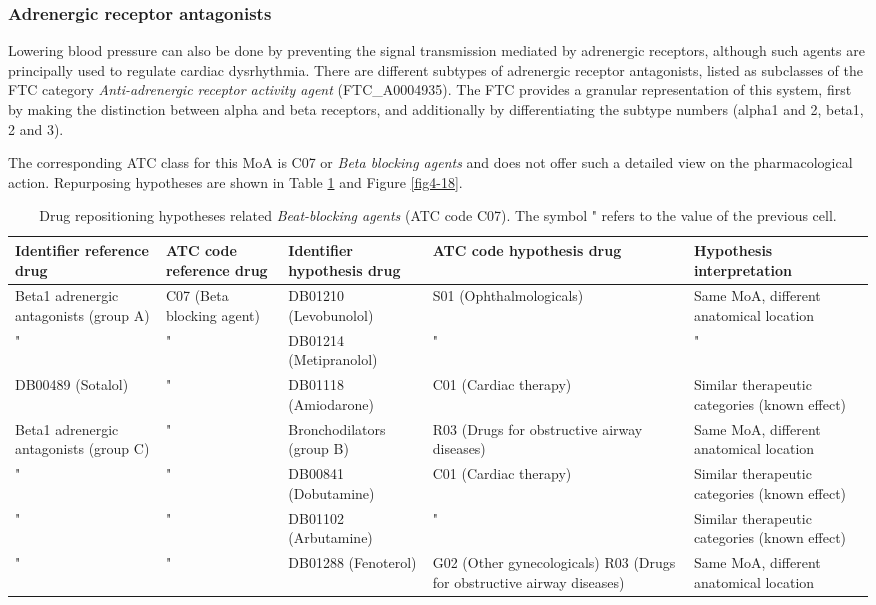 \subsubsection{Adrenergic receptor antagonists}
Lowering blood pressure can also be done by preventing the signal transmission mediated by adrenergic receptors, although such agents are principally used to regulate cardiac dysrhythmia.
There are different subtypes of adrenergic receptor antagonists, listed as subclasses of the FTC category \emph{Anti-adrenergic receptor activity agent} (FTC\_A0004935). The FTC provides a granular representation of this system, first by making the distinction between alpha and beta receptors, and additionally by differentiating the subtype numbers (alpha1 and 2, beta1, 2 and 3).

The corresponding ATC class for this MoA is C07 or \emph{Beta blocking agents} and does not offer such a detailed view on the pharmacological action. Repurposing hypotheses are shown in Table \ref{tab:tablec07} and Figure \ref{fig4-18}.

\begin{table}[htbp]
\scriptsize
\begin{tabular}{|p{2cm}|p{2cm}|p{2cm}|p{3cm}|p{4cm}|}
\hline
\textbf{Identifier reference drug} & \textbf{ATC code reference drug} & \textbf{Identifier hypothesis drug} & \textbf{ATC code hypothesis drug} & \textbf{Hypothesis interpretation} \\ \hline
Beta1 adrenergic antagonists (group A) & C07 (Beta blocking agent) & DB01210 (Levobunolol) & S01 (Ophthalmologicals) & Same MoA, different anatomical location \\ \hline
" & " & DB01214 (Metipranolol) & " & " \\ \hline
DB00489 (Sotalol) & " & DB01118 (Amiodarone) & C01 (Cardiac therapy) & Similar therapeutic categories (known effect) \\ \hline
Beta1 adrenergic antagonists (group C) & " & Bronchodilators (group B) & R03 (Drugs for obstructive airway diseases) & Same MoA, different anatomical location \\ \hline
" & " & DB00841 (Dobutamine) & C01 (Cardiac therapy) & Similar therapeutic categories (known effect) \\ \hline
" & " & DB01102 (Arbutamine) & " & Similar therapeutic categories (known effect) \\ \hline
" & " & DB01288 (Fenoterol) & G02 (Other gynecologicals)
R03 (Drugs for obstructive airway diseases) & Same MoA, different anatomical location \\ \hline
\end{tabular}
\caption{Drug repositioning hypotheses related \emph{Beat-blocking agents} (ATC code C07). The symbol " refers to the value of the previous cell.}
\label{tab:tablec07}
\end{table}

